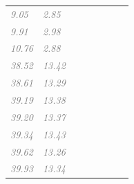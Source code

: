 \documentclass[
  letterpaper,
  DIV=11,
  numbers=noendperiod]{scrartcl}
\newcommand{\cmark}{\ding{51}}
\begin{document}
\begin{longtable}[t]{llccccll}
\textcolor{gray}{\em{9.05}} & \textcolor{gray}{\em{2.85}} & \textcolor{gray}{\em{\cmark}} & \textcolor{gray}{\em{\cmark}} & \textcolor{gray}{\em{}} & \textcolor{gray}{\em{}} & \textcolor{gray}{\em{\cmark}} & \textcolor{gray}{\em{\cmark}}\\
\textcolor{gray}{\em{9.91}} & \textcolor{gray}{\em{2.98}} & \textcolor{gray}{\em{\cmark}} & \textcolor{gray}{\em{\cmark}} & \textcolor{gray}{\em{\cmark}} & \textcolor{gray}{\em{\cmark}} & \textcolor{gray}{\em{\cmark}} & \textcolor{gray}{\em{}}\\
\addlinespace
\textcolor{gray}{\em{10.76}} & \textcolor{gray}{\em{2.88}} & \textcolor{gray}{\em{}} & \textcolor{gray}{\em{\cmark}} & \textcolor{gray}{\em{\cmark}} & \textcolor{gray}{\em{}} & \textcolor{gray}{\em{\cmark}} & \textcolor{gray}{\em{\cmark}}\\
\textcolor{gray}{\em{38.52}} & \textcolor{gray}{\em{13.42}} & \textcolor{gray}{\em{\cmark}} & \textcolor{gray}{\em{\cmark}} & \textcolor{gray}{\em{}} & \textcolor{gray}{\em{}} & \textcolor{gray}{\em{}} & \textcolor{gray}{\em{}}\\
\textcolor{gray}{\em{38.61}} & \textcolor{gray}{\em{13.29}} & \textcolor{gray}{\em{\cmark}} & \textcolor{gray}{\em{\cmark}} & \textcolor{gray}{\em{}} & \textcolor{gray}{\em{}} & \textcolor{gray}{\em{}} & \textcolor{gray}{\em{\cmark}}\\
\textcolor{gray}{\em{39.19}} & \textcolor{gray}{\em{13.38}} & \textcolor{gray}{\em{}} & \textcolor{gray}{\em{\cmark}} & \textcolor{gray}{\em{\cmark}} & \textcolor{gray}{\em{\cmark}} & \textcolor{gray}{\em{}} & \textcolor{gray}{\em{\cmark}}\\
\textcolor{gray}{\em{39.20}} & \textcolor{gray}{\em{13.37}} & \textcolor{gray}{\em{\cmark}} & \textcolor{gray}{\em{\cmark}} & \textcolor{gray}{\em{\cmark}} & \textcolor{gray}{\em{}} & \textcolor{gray}{\em{}} & \textcolor{gray}{\em{}}\\
\addlinespace
\textcolor{gray}{\em{39.34}} & \textcolor{gray}{\em{13.43}} & \textcolor{gray}{\em{\cmark}} & \textcolor{gray}{\em{\cmark}} & \textcolor{gray}{\em{\cmark}} & \textcolor{gray}{\em{\cmark}} & \textcolor{gray}{\em{}} & \textcolor{gray}{\em{\cmark}}\\
\textcolor{gray}{\em{39.62}} & \textcolor{gray}{\em{13.26}} & \textcolor{gray}{\em{}} & \textcolor{gray}{\em{\cmark}} & \textcolor{gray}{\em{\cmark}} & \textcolor{gray}{\em{}} & \textcolor{gray}{\em{}} & \textcolor{gray}{\em{}}\\
\textcolor{gray}{\em{39.93}} & \textcolor{gray}{\em{13.34}} & \textcolor{gray}{\em{}} & \textcolor{gray}{\em{\cmark}} & \textcolor{gray}{\em{\cmark}} & \textcolor{gray}{\em{}} & \textcolor{gray}{\em{}} & \textcolor{gray}{\em{\cmark}}\\

\end{longtable}
\end{document}

